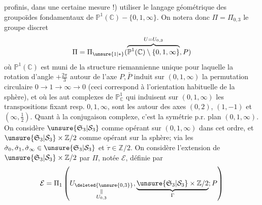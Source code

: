 profinis, dans une certaine mesure !) utiliser le langage géométrique des groupoïdes fondamentaux de $\mathbb P^1(\mathbb C)-\{0,1,\infty\}$. On  notera donc $\Pi=\Pi_{0,3}$ le groupe discret
\[
\Pi=\Pi_{\unsure{1|*}}(\overbrace{\mathbb P^1(\mathbb C)\setminus\{0,1,\infty\}}^{U=U_{0,3}},P)
\]
où $\mathbb P^1(\mathbb C)$ est muni de la structure  riemannienne  unique pour laquelle la rotation \inserted{$\dot\rho$} d'angle $+\frac{2\pi}{3}$ autour de l'axe $P,\bar P$  induit sur $(0,1,\infty)$ la permutation circulaire $0\longrightarrow1\longrightarrow\infty\longrightarrow0$ (ceci correspond à l'orientation habituelle de la sphère), et où les aut complexes  de $\mathbb P^1_{\mathbb C}$ qui   induisent  sur $(0,1,\infty)$ les transpositions fixant resp. $0,1,\infty$, sont  les   autour des axes  $(0,2)$, $(1,-1)$ et $(\infty,\frac12)$.
Quant à la conjugaison complexe, c'est la symétrie p.r.  plan $(0,1,\infty)$. On considère $\unsure{\mathfrak S_3|\mathcal S_3}$ comme opérant sur $(0,1,\infty)$ dans cet ordre, et $\unsure{\mathfrak S_3|\mathcal S_3}\times\mathbb Z/2$ comme opérant sur la sphère; via les $\dot\sigma_0,\dot\sigma_1,\dot\sigma_\infty\in\unsure{\mathfrak S_3|\mathcal S_3}$ et $\dot\tau\in\mathbb Z/2$. On considère l'extension  de $\unsure{\mathfrak S_3|\mathcal S_3}\times\mathbb Z/2$ par $\Pi$, notée  $\mathcal E$, définie par
\[
\mathcal E=\Pi_1\left(\underset{\substack{\Vert\\U_{0,3}}}{U_{\deleted{\unsure{0,3}}}},\underbrace{\unsure{\mathfrak S_3|\mathcal S_3}\times\mathbb Z/2}_{\Gamma};P\right)
\]
